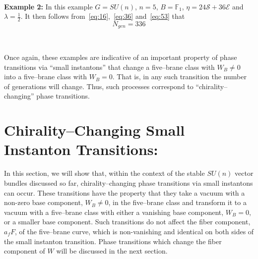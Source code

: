 \documentclass[a4paper,12pt]{article}
\numberwithin{equation}{section}
\def\cE{{\mathcal E}}
\def\cS{{\mathcal S}}
\theoremstyle{plain}
\begin{document}
\smallskip

\

\noindent
{\bf Example 2:} \quad In this example 
$G=SU(n)$, $n=5$, $B={\mathbb F}_{1}$, $\eta=24\cS+36\cE$ and
$\lambda=\frac{1}{2}$. It then follows
from~\eqref{eq:16},~\eqref{eq:36} and~\eqref{eq:53} that 
\begin{equation}
N_{gen}=336
\label{eq:55}
\end{equation}


\smallskip

\

Once again, these examples are indicative of an important property of phase
transitions via ``small instantons'' that change a five--brane class with
$W_{B} \neq 0$ into a five--brane class with $W_{B}=0$. That is, in any such
transition the number of generations will change. Thus, such processes
correspond to ``chirality--changing'' phase transitions.


\section{Chirality--Changing Small Instanton Transitions:}
\label{sec-chirality}


In this section, we will show that, within the 
context of the stable $SU(n)$ vector bundles discussed so far, 
chirality--changing phase transitions via small
instantons can occur. These transitions have the property that they 
take a vacuum with a non-zero base
component, $W_{B} \neq 0$, in the five--brane class and transform it to a
vacuum with a five--brane class with either a vanishing base component,
$W_{B}=0$, or a smaller base component.
Such transitions do not affect the fiber component, $a_{f}F$, of the
five--brane curve, which is non-vanishing and identical on both sides of the
small instanton transition. Phase transitions which change the fiber component
of $W$ will be discussed in the next section.
\end{document}
